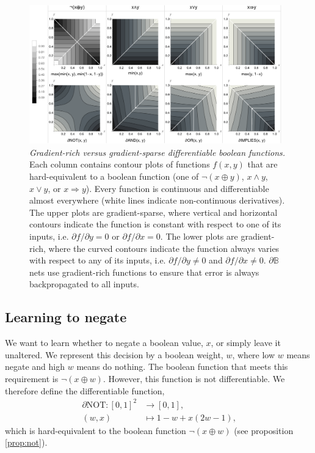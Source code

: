 \documentclass{article} %
\begin{document}
\begin{figure}[t]
	\centering
	\includegraphics[trim=0pt 0pt 0pt 0pt, clip, width=0.975\textwidth]{logic-gates.png}
	\caption{{\em Gradient-rich versus gradient-sparse differentiable boolean functions.} Each column contains contour plots of functions $f(x,y)$ that are hard-equivalent to a boolean function (one of $\neg(x \oplus y)$, $x \wedge y$, $x \vee y$, or $x \Rightarrow y$). Every function is continuous and differentiable almost everywhere (white lines indicate non-continuous derivatives). The upper plots are gradient-sparse, where vertical and horizontal contours indicate the function is constant with respect to one of its inputs, i.e. $\partial f/\partial y = 0$ or $\partial f/\partial x = 0$. The lower plots are gradient-rich, where the curved contours indicate the function always varies with respect to any of its inputs, i.e. $\partial f/\partial y \neq 0$ and $\partial f/\partial x \neq 0$. $\partial \mathbb{B}$ nets use gradient-rich functions to ensure that error is always backpropagated to all inputs.} 
	\label{fig:gradient-rich}
\end{figure}

\subsection{Learning to negate}

We want to learn whether to negate a boolean value, $x$, or simply leave it unaltered. We represent this decision by a boolean weight, $w$, where low $w$ means negate and high $w$ means do nothing. The boolean function that meets this requirement is $\neg(x \oplus w)$. However, this function is not differentiable. We therefore define the differentiable function,
	\begin{equation*}
	\begin{aligned}
	\partial\text{NOT}: [0, 1]^{2} &\to [0,1], \\
	(w, x) &\mapsto 1 - w + x (2w - 1)\text{,}
	\end{aligned}
	\end{equation*}
which is hard-equivalent to the boolean function $\neg(x \oplus w)$ (see proposition \ref{prop:not}).
\end{document}
